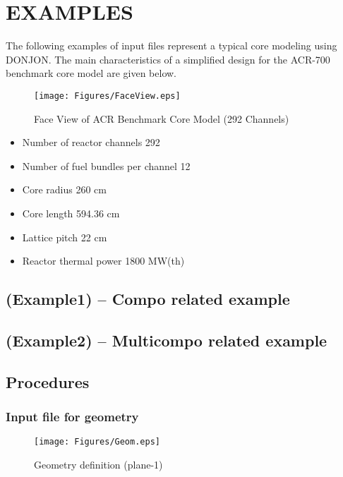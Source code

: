 \section{EXAMPLES}

The following examples of input files represent a typical core modeling
using DONJON. The main characteristics of a simplified design for the
ACR-700 benchmark core model are given below.

\vskip 1.2cm
\begin{figure}[h!]
  \begin{center}
    \texttt{[image: Figures/FaceView.eps]} 
\caption{Face View of ACR Benchmark Core Model (292 Channels)}\label{fig:face}
  \end{center}
\end{figure}

\begin{itemize}

\item Number of reactor channels 292
\item Number of fuel bundles per channel 12
\item Core radius 260 cm
\item Core length 594.36 cm
\item Lattice pitch 22 cm
\item Reactor thermal power 1800 MW(th)

\end{itemize}

\goodbreak
\subsection{\tst(Example1) -- Compo related example}

\goodbreak
\subsection{\tst(Example2) -- Multicompo related example}

\goodbreak
\subsection{Procedures}
\subsubsection{Input file for geometry}
\vskip 0.5cm
\begin{figure}[h!]
  \begin{center}
    \texttt{[image: Figures/Geom.eps]} 
\caption{Geometry definition (plane-1)}\label{fig:geom}
  \end{center}
\end{figure}

